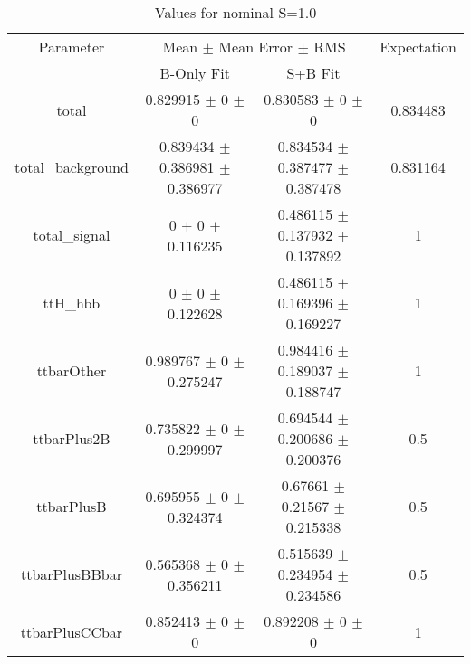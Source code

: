 \begin{table}
\centering
\caption{Values for nominal S=1.0}
\begin{tabular}{cccc}
\toprule
Parameter & \multicolumn{2}{c}{Mean $\pm$ Mean Error $\pm$ RMS} & Expectation\\
 & B-Only Fit & S+B Fit & \\
\midrule
total & \num{0.829915} $\pm$ \num{0} $\pm$ \num{0} & \num{0.830583} $\pm$ \num{0} $\pm$ \num{0} & \num{0.834483}\\
total\_background & \num{0.839434} $\pm$ \num{0.386981} $\pm$ \num{0.386977} & \num{0.834534} $\pm$ \num{0.387477} $\pm$ \num{0.387478} & \num{0.831164}\\
total\_signal & \num{0} $\pm$ \num{0} $\pm$ \num{0.116235} & \num{0.486115} $\pm$ \num{0.137932} $\pm$ \num{0.137892} & \num{1}\\
ttH\_hbb & \num{0} $\pm$ \num{0} $\pm$ \num{0.122628} & \num{0.486115} $\pm$ \num{0.169396} $\pm$ \num{0.169227} & \num{1}\\
ttbarOther & \num{0.989767} $\pm$ \num{0} $\pm$ \num{0.275247} & \num{0.984416} $\pm$ \num{0.189037} $\pm$ \num{0.188747} & \num{1}\\
ttbarPlus2B & \num{0.735822} $\pm$ \num{0} $\pm$ \num{0.299997} & \num{0.694544} $\pm$ \num{0.200686} $\pm$ \num{0.200376} & \num{0.5}\\
ttbarPlusB & \num{0.695955} $\pm$ \num{0} $\pm$ \num{0.324374} & \num{0.67661} $\pm$ \num{0.21567} $\pm$ \num{0.215338} & \num{0.5}\\
ttbarPlusBBbar & \num{0.565368} $\pm$ \num{0} $\pm$ \num{0.356211} & \num{0.515639} $\pm$ \num{0.234954} $\pm$ \num{0.234586} & \num{0.5}\\
ttbarPlusCCbar & \num{0.852413} $\pm$ \num{0} $\pm$ \num{0} & \num{0.892208} $\pm$ \num{0} $\pm$ \num{0} & \num{1}\\
\bottomrule
\end{tabular}
\end{table}